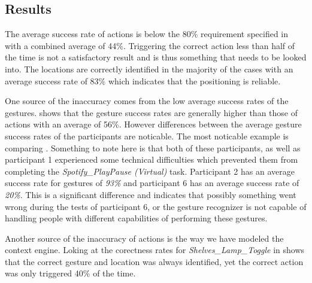 \subsection{Results}
\label{sec:evaluation:user-tests-results}

The average success rate of actions is below the 80\% requirement specified in  with a combined average of 44\%.
Triggering the correct action less than half of the time is not a satisfactory result and is thus something that needs to be looked into.
The locations are correctly identified in the majority of the cases with an average success rate of 83\% which indicates that the positioning is reliable.

One source of the inaccuracy comes from the low average success rates of the gestures.
 shows that the gesture success rates are generally higher than those of actions with an average of 56\%.
However differences between the average gesture success rates of the participants are noticable.
The most noticable example is comparing .
Something to note here is that both of these participants, as well as participant 1 experienced some technical difficulties which prevented them from completing the \emph{Spotify\_PlayPause (Virtual)} task.
Participant 2 has an average success rate for gestures of \emph{93\%} and participant 6 has an average success rate of \emph{20\%}.
This is a significant difference and indicates that possibly something went wrong during the tests of participant 6, or the gesture recognizer is not capable of handling people with different capabilities of performing these gestures.

Another source of the inaccuracy of actions is the way we have modeled the context engine.
Loking at the corectness rates for \emph{Shelves_Lamp_Toggle} in  shows that the correct gesture and location was always identified, yet the correct action was only triggered 40\% of the time.

